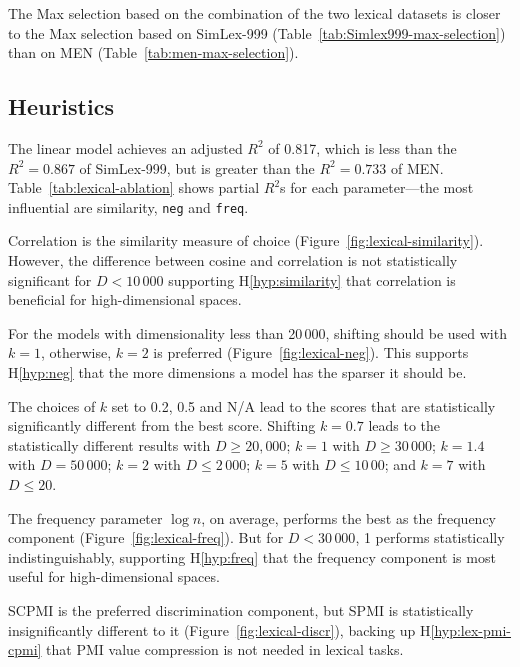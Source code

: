 The Max selection based on the combination of the two lexical datasets is closer to the Max selection based on SimLex-999 (Table~\ref{tab:Simlex999-max-selection}) than on MEN (Table~\ref{tab:men-max-selection}).



\subsection{Heuristics}



The linear model achieves an adjusted $R^2$ of 0.817, which is less than the $R^2 = 0.867$ of SimLex-999, but is greater than the $R^2 = 0.733$ of MEN. Table~\ref{tab:lexical-ablation} shows partial $R^2$s for each parameter---the most influential are similarity, \texttt{neg} and \texttt{freq}.

 Correlation is the similarity measure of choice (Figure~\ref{fig:lexical-similarity}). However, the difference between cosine and correlation is not statistically significant for $D < 10\,000$ supporting H\ref{hyp:similarity} that correlation is beneficial for high-dimensional spaces.



For the models with dimensionality less than 20\,000, shifting should be used with $k = 1$, otherwise, $k = 2$ is preferred (Figure~\ref{fig:lexical-neg}). This supports H\ref{hyp:neg} that the more dimensions a model has the sparser it should be.

The choices of $k$ set to 0.2, 0.5 and N/A lead to the scores that are statistically significantly different from the best score. Shifting $k = 0.7$ leads to the statistically different results with $D \ge 20,000$; $k = 1$ with $D \ge 30\,000$; $k = 1.4$ with $D = 50\,000$; $k = 2$ with $D \le 2\,000$; $k = 5$ with $D \le 10\,00$; and $k = 7$ with $D \le 20$.

 The frequency parameter $\log n$, on average, performs the best as the frequency component (Figure~\ref{fig:lexical-freq}). But for $D < 30\,000$, 1 performs statistically indistinguishably, supporting H\ref{hyp:freq} that the frequency component is most useful for high-dimensional spaces.

SCPMI is the preferred discrimination component, but SPMI is statistically
insignificantly different to it (Figure~\ref{fig:lexical-discr}), backing up H\ref{hyp:lex-pmi-cpmi} that PMI value compression is not needed in lexical tasks.

